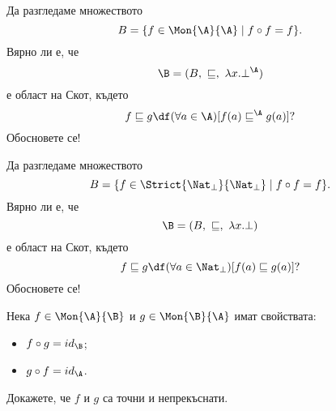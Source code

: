 \begin{problem} %
  Да разгледаме множеството
  \[B = \{f \in \Mon{\A}{\A} \mid f\circ f = f\}.\]
  Вярно ли е, че 
  \[\B = (B,\ \sqsubseteq,\ \lambda x.\bot^\A)\] е област на Скот,
  където 
  \[f \sqsubseteq g \df (\forall a\in\A)[f(a) \sqsubseteq^\A g(a)] ?\]
  Обосновете се!
\end{problem}


\begin{problem} %
  Да разгледаме множеството
  \[B = \{f \in \Strict{\Nat_\bot}{\Nat_\bot} \mid f\circ f = f\}.\]
  Вярно ли е, че 
  \[\B = (B,\ \sqsubseteq,\ \lambda x.\bot)\] е област на Скот,
  където 
  \[f \sqsubseteq g \df (\forall a\in\Nat_\bot)[f(a) \sqsubseteq g(a)] ?\]
  Обосновете се!
\end{problem}

\begin{problem}
  Нека $f \in \Mon{\A}{\B}$ и $g \in \Mon{\B}{\A}$ имат свойствата:
  \begin{itemize}
  \item 
    $f\circ g = id_\B$;
  \item
    $g \circ f = id_\A$.
  \end{itemize}
  Докажете, че $f$ и $g$ са точни и непрекъснати.
\end{problem}



